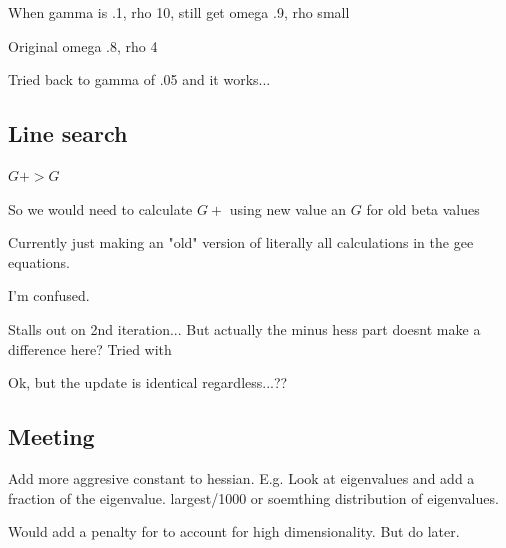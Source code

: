 \documentclass[10pt]{article}
\theoremstyle{definition}
\begin{document}
When gamma is .1, rho 10, still get omega .9, rho small

Original omega .8, rho 4

Tried back to gamma of .05 and it works...


\subsection{Line search}

$G+ > G$

So we would need to calculate $G+$ using new value an $G$ for old beta values

Currently just making an "old" version of literally all calculations in the gee equations.

I'm confused.

Stalls out on 2nd iteration...
But actually the minus hess part doesnt make a difference here?
Tried with

Ok, but the update is identical regardless...??

\subsection{Meeting}

Add more aggresive constant to hessian.
E.g. Look at eigenvalues and add a fraction of the eigenvalue. largest/1000 or soemthing
distribution of eigenvalues.


Would add a penalty for to account for high dimensionality.
But do later.
\end{document}
